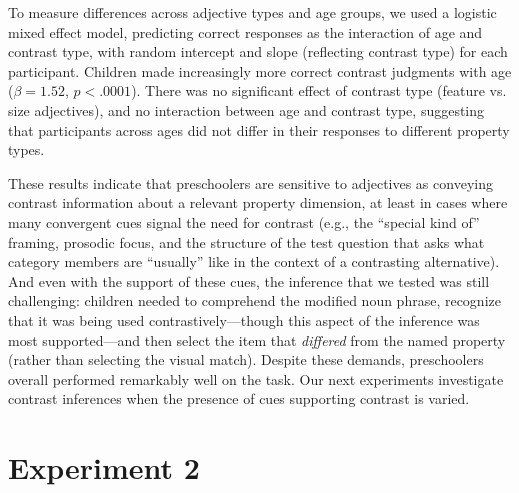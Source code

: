 \documentclass[man]{apa2}
\begin{document}

To measure differences across adjective types and age groups, we used a logistic mixed effect model, predicting correct responses as the interaction of age and contrast type, with random intercept and slope (reflecting contrast type) for each participant. Children made increasingly more correct contrast judgments with age ($\beta = 1.52$, $p < .0001$). There was no significant effect of contrast type (feature vs. size adjectives), and no interaction between age and contrast type, suggesting that participants across ages did not differ in their responses to different property types.  

These results indicate that preschoolers are sensitive to adjectives as conveying contrast information about a relevant property dimension, at least in cases where many convergent cues signal the need for contrast (e.g., the ``special kind of'' framing, prosodic focus, and the structure of the test question that asks what category members are ``usually'' like in the context of a contrasting alternative). And even with the support of these cues, the inference that we tested was still challenging: children needed to comprehend the modified noun phrase, recognize that it was being used contrastively---though this aspect of the inference was most supported---and then select the item that \emph{differed} from the named property (rather than selecting the visual match). Despite these demands, preschoolers overall performed remarkably well on the task. Our next experiments investigate contrast inferences when the presence of cues supporting contrast is varied.





\section{Experiment 2}

\end{document}
